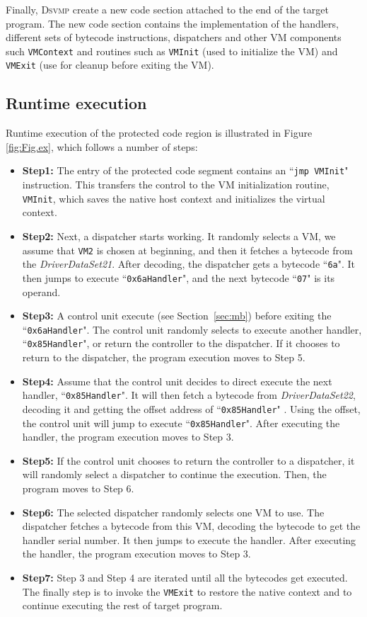 \documentclass[preprint,12pt,3p]{elsarticle}
\newcommand{\DSVMP}{\textsc{Dsvmp}\xspace}
\begin{document}
Finally, \DSVMP create a new code section attached to the end of the target program.
The new code section contains the implementation of the handlers, different sets of bytecode instructions,
dispatchers and other VM components such \texttt{VMContext} and routines such as
\texttt{VMInit} (used to initialize the VM) and \texttt{VMExit} (use for cleanup before exiting the VM).



\subsection{Runtime execution}
Runtime execution of the protected code region is illustrated in Figure \ref{fig:Fig.ex}, which follows a number of steps:
\begin{itemize}
\item \textbf{Step1:} The entry of the protected code segment contains an ``\texttt{jmp VMInit}" instruction. This transfers the control to the VM initialization routine, \texttt{VMInit}, which saves the native host context and initializes the virtual context.
\item \textbf{Step2:} Next, a dispatcher starts working. It randomly selects a VM, we assume that \texttt{VM2} is chosen at beginning, and then it fetches a bytecode from the \emph{DriverDataSet21}. After decoding, the dispatcher gets a bytecode ``\texttt{6a}". It then jumps to execute ``\texttt{0x6aHandler}", and the next bytecode ``\texttt{07}" is its operand.
\item \textbf{Step3:} A control unit execute (see Section~\ref{sec:mb}) before exiting the ``\texttt{0x6aHandler}". The control unit randomly selects to execute another handler, ``\texttt{0x85Handler}", or return the controller to the dispatcher. If it chooses to return to the dispatcher, the program execution moves to Step 5.
\item \textbf{Step4:} Assume that the control unit decides to direct execute the next handler, ``\texttt{0x85Handler}". It will then fetch a bytecode from \emph{DriverDataSet22}, decoding it and getting the offset address of ``\texttt{0x85Handler}" . Using the offset, the control unit will jump to execute ``\texttt{0x85Handler}". After executing the handler, the program execution moves to Step 3.
\item \textbf{Step5:} If the control unit chooses to return the controller to a dispatcher, it will randomly select a dispatcher to continue the execution. Then, the program moves to Step 6.
\item \textbf{Step6:} The selected dispatcher randomly selects one VM to use. The dispatcher fetches a bytecode from this VM, decoding the bytecode to get the handler serial number.
    It then jumps to execute the handler. After executing the handler, the program execution moves to Step 3.
\item \textbf{Step7:} Step 3 and Step 4 are iterated until all the bytecodes get executed. The finally step is to invoke the \texttt{VMExit} to restore the native context and to continue executing the rest of target program.
\end{itemize}
\end{document}
